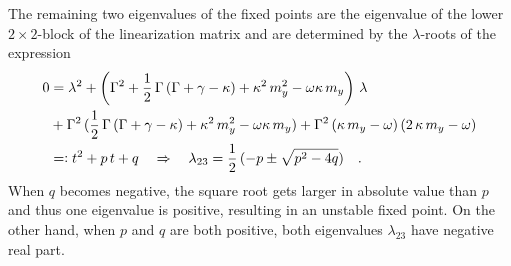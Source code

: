 

The remaining two eigenvalues of the fixed points are the eigenvalue of the lower $2\times2$-block of the linearization matrix and are determined by the $\lambda$-roots of the expression
\begin{align*}
    0&=\lambda^2+\left( \Gamma^2 +\frac{1}{2}\,\Gamma\,(\Gamma+\gamma-\kappa)+\kappa^2\,m_y^2
    -\omega\kappa\,m_y\right)\,\lambda\\
    &+\Gamma^2\,(\frac{1}{2}\,\Gamma\,(\Gamma+\gamma-\kappa)+\kappa^2\,m_y^2-\omega\kappa\,m_y)
    +\Gamma^2\,(\kappa\,m_y-\omega)\,(2\,\kappa\,m_y-\omega)\\
    &=\vcentcolon t^2+p\,t+q\quad
    \Rightarrow\quad\lambda_{23}=\frac{1}{2}\,(-p\pm\sqrt{p^2-4q})\quad.
\end{align*}
When $q$ becomes negative, the square root gets larger in absolute value than $p$ and thus one eigenvalue is positive, resulting in an unstable fixed point. On the other hand, when $p$ and $q$ are both positive, both eigenvalues $\lambda_{23}$ have negative real part.

